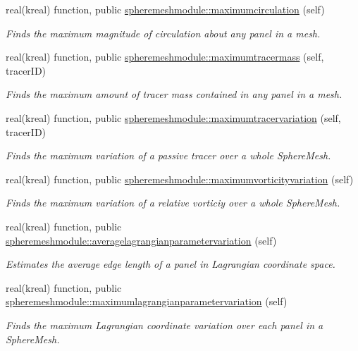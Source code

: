 \begin{DoxyCompactItemize}
real(kreal) function, public \hyperlink{group__SphereMesh_ga6686ad6af0289f6a4fb2fc33c8aaaec0}{spheremeshmodule\+::maximumcirculation} (self)
\begin{DoxyCompactList}\small\item\em Finds the maximum magnitude of circulation about any panel in a mesh. \end{DoxyCompactList}\item 
real(kreal) function, public \hyperlink{group__SphereMesh_ga5e91a046c4930eb535d416ecd186d642}{spheremeshmodule\+::maximumtracermass} (self, tracer\+I\+D)
\begin{DoxyCompactList}\small\item\em Finds the maximum amount of tracer mass contained in any panel in a mesh. \end{DoxyCompactList}\item 
real(kreal) function, public \hyperlink{group__SphereMesh_ga6f36560d3412a7d7e4cfa5befdb7533a}{spheremeshmodule\+::maximumtracervariation} (self, tracer\+I\+D)
\begin{DoxyCompactList}\small\item\em Finds the maximum variation of a passive tracer over a whole Sphere\+Mesh. \end{DoxyCompactList}\item 
real(kreal) function, public \hyperlink{group__SphereMesh_gaae2d1cf4ffc3bae54040cbeea7b7d0be}{spheremeshmodule\+::maximumvorticityvariation} (self)
\begin{DoxyCompactList}\small\item\em Finds the maximum variation of a relative vorticiy over a whole Sphere\+Mesh. \end{DoxyCompactList}\item 
real(kreal) function, public \hyperlink{group__SphereMesh_gaa98d1a869045c29e59c388b3defd5267}{spheremeshmodule\+::averagelagrangianparametervariation} (self)
\begin{DoxyCompactList}\small\item\em Estimates the average edge length of a panel in Lagrangian coordinate space. \end{DoxyCompactList}\item 
real(kreal) function, public \hyperlink{group__SphereMesh_ga27be9c6a5c086d37db3dd65c2c8ec37b}{spheremeshmodule\+::maximumlagrangianparametervariation} (self)
\begin{DoxyCompactList}\small\item\em Finds the maximum Lagrangian coordinate variation over each panel in a Sphere\+Mesh. \end{DoxyCompactList}\end{DoxyCompactItemize}


